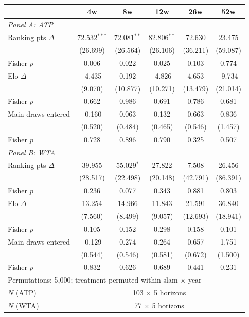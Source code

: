 \begin{tabular}{l ccccc}
\toprule
 & 4w & 8w & 12w & 26w & 52w \\
\midrule
\multicolumn{6}{l}{\textit{Panel A: ATP}} \\
\midrule
Ranking pts $\Delta$ & 72.532$^{***}$ & 72.081$^{**}$ & 82.806$^{**}$ & 72.630 & 23.475 \\
  & (26.699) & (26.564) & (26.106) & (36.211) & (59.087) \\
  Fisher $p$ & 0.006 & 0.022 & 0.025 & 0.103 & 0.774 \\[0.3em]
Elo $\Delta$ & -4.435 & 0.192 & -4.826 & 4.653 & -9.734 \\
  & (9.070) & (10.877) & (10.271) & (13.479) & (21.014) \\
  Fisher $p$ & 0.662 & 0.986 & 0.691 & 0.786 & 0.681 \\[0.3em]
Main draws entered & -0.160 & 0.063 & 0.132 & 0.663 & 0.836 \\
  & (0.520) & (0.484) & (0.465) & (0.546) & (1.457) \\
  Fisher $p$ & 0.728 & 0.896 & 0.790 & 0.325 & 0.507 \\[0.3em]

\multicolumn{6}{l}{\textit{Panel B: WTA}} \\
\midrule
Ranking pts $\Delta$ & 39.955 & 55.029$^{*}$ & 27.822 & 7.508 & 26.456 \\
  & (28.517) & (22.498) & (20.148) & (42.791) & (86.391) \\
  Fisher $p$ & 0.236 & 0.077 & 0.343 & 0.881 & 0.803 \\[0.3em]
Elo $\Delta$ & 13.254 & 14.966 & 11.843 & 21.591 & 36.840 \\
  & (7.560) & (8.499) & (9.057) & (12.693) & (18.941) \\
  Fisher $p$ & 0.105 & 0.152 & 0.298 & 0.158 & 0.101 \\[0.3em]
Main draws entered & -0.129 & 0.274 & 0.264 & 0.657 & 1.751 \\
  & (0.544) & (0.546) & (0.581) & (0.672) & (1.500) \\
  Fisher $p$ & 0.832 & 0.626 & 0.689 & 0.441 & 0.231 \\[0.3em]
\midrule
\multicolumn{6}{l}{Permutations: 5,000; treatment permuted within slam $\times$ year} \\
$N$ (ATP) & \multicolumn{5}{c}{103 $\times$ 5 horizons} \\
$N$ (WTA) & \multicolumn{5}{c}{77 $\times$ 5 horizons} \\
\bottomrule
\end{tabular}
